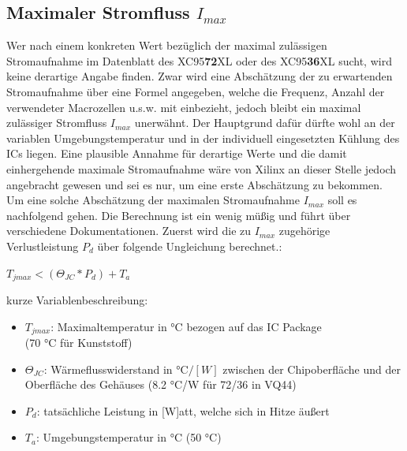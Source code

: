 \documentclass{article}
\begin{document}
\subsection{Maximaler Stromfluss $I_{max}$}
\label{sec:max_I}
Wer nach einem konkreten Wert bezüglich der maximal zulässigen Stromaufnahme im Datenblatt \autocite{XC95_Spec} des XC95\textbf{72}XL oder des XC95\textbf{36}XL sucht, wird keine derartige Angabe finden.
Zwar wird eine Abschätzung der zu erwartenden Stromaufnahme über eine Formel angegeben, welche die Frequenz, Anzahl der verwendeter Macrozellen u.s.w. mit einbezieht, jedoch bleibt ein maximal zulässiger Stromfluss $I_{max}$ unerwähnt. Der Hauptgrund dafür dürfte wohl an der variablen Umgebungstemperatur und in der individuell eingesetzten Kühlung des ICs liegen. Eine plausible Annahme für derartige Werte und die damit einhergehende maximale Stromaufnahme wäre von Xilinx an dieser Stelle jedoch angebracht gewesen und sei es nur, um eine erste Abschätzung zu bekommen.\\

Um eine solche Abschätzung der maximalen Stromaufnahme $I_{max}$ soll es nachfolgend gehen. Die Berechnung ist ein wenig müßig und führt über verschiedene Dokumentationen.
Zuerst wird die zu $I_{max}$ zugehörige Verlustleistung $P_d$ über folgende Ungleichung berechnet.\autocite[16]{XC95_maxI}: 
\begin{center}
	$T_{jmax} < (\Theta_{JC}*P_d)+T_a$
\end{center}

\newpage

kurze Variablenbeschreibung:

\begin{itemize}
	\item $T_{jmax}$: Maximaltemperatur in \si{\celsius} bezogen auf das IC Package \\(70 \si{\celsius} für Kunststoff) \autocite[54]{Device_pkg}
	\item $\Theta_{JC}$: Wärmeflusswiderstand in $\si{\celsius}/[W]$ zwischen der Chipoberfläche und der Oberfläche des Gehäuses \autocite[53]{Device_pkg} (8.2 \si{\celsius}/W für 72/36 in VQ44)
	\item $P_d$: tatsächliche Leistung in [W]att, welche sich in Hitze äußert \autocite[16]{XC95_maxI}
	\item $T_a$: Umgebungstemperatur in \si{\celsius} (50 \si{\celsius})
\end{itemize}
\end{document}
